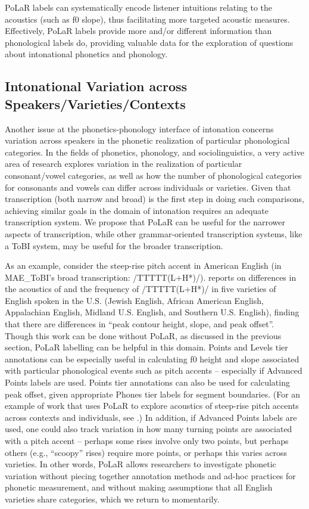 \documentclass[11pt, twoside]{memoir}
\begin{document}
PoLaR labels can systematically encode listener intuitions relating to the acoustics (such as f0 slope), thus facilitating more targeted acoustic measures. Effectively, PoLaR labels provide more and/or different information than phonological labels do, providing valuable data for the exploration of questions about intonational phonetics and phonology.

\subsection{Intonational Variation across Speakers\slash Varieties\slash Contexts}\label{sec:interspeaker-variation-in-realization-of-prosodic-categories}

Another issue at the phonetics-phonology interface of intonation concerns variation across speakers in the phonetic realization of particular phonological categories. In the fields of phonetics, phonology, and sociolinguistics, a very active area of research explores variation in the realization of particular consonant\slash vowel categories, as well as how the number of phonological categories for consonants and vowels can differ across individuals or varieties. Given that transcription (both narrow and broad) is the first step in doing such comparisons, achieving similar goals in the domain of intonation requires an adequate transcription system. We propose that PoLaR can be useful for the narrower aspects of transcription, while other grammar-oriented transcription systems, like a ToBI system, may be useful for the broader transcription.

As an example, consider the steep-rise pitch accent in American English (in MAE\_ToBI’s broad transcription: /TTTTT(L+H*)/). \citealt{burdin-18} reports on differences in the acoustics of and the frequency of /TTTTT(L+H*)/ in five varieties of English spoken in the U.S. (Jewish English, African American English, Appalachian English, Midland U.S. English, and Southern U.S. English), finding that there are differences in “peak contour height, slope, and peak offset”. Though this work can be done without PoLaR, as discussed in the previous section, PoLaR labelling can be helpful in this domain. Points and Levels tier annotations can be especially useful in calculating f0 height and slope associated with particular phonological events such as pitch accents – especially if Advanced Points labels are used. Points tier annotations can also be used for calculating peak offset, given appropriate Phones tier labels for segment boundaries. (For an example of work that uses PoLaR to explore acoustics of steep-rise pitch accents across contexts and individuals, see \citealt{holliday21a}.)  In addition, if Advanced Points labels are used, one could also track variation in how many turning points are associated with a pitch accent – perhaps some rises involve only two points, but perhaps others (e.g., “scoopy” rises) require more points, or perhaps this varies across varieties. In other words, PoLaR allows researchers to investigate phonetic variation without piecing together annotation methods and ad-hoc practices for phonetic measurement, and without making assumptions that all English varieties share categories, which we return to momentarily.
\end{document}
